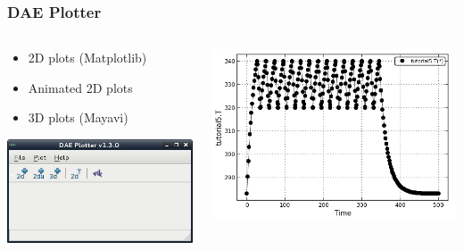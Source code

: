 \documentclass[compress,newPxFont,sthlmFooter]{beamer}
\begin{document}
\begin{frame}
\frametitle{DAE Plotter}
\begin{columns}
  \begin{column}{0.5\paperwidth}
    \begin{center}
      \begin{itemize}
	\item 2D plots (Matplotlib)
	\item Animated 2D plots
	\item 3D plots (Mayavi)
      \end{itemize}
    \end{center}
    \begin{center}
      \includegraphics[width=0.35\paperwidth]{../_static/daeplotter.png}
    \end{center}
  \end{column}
  \begin{column}{0.5\paperwidth}
    \begin{center}
      \includegraphics[width=0.35\paperwidth]{../_static/sample_2d_plot.png}
    \end{center}

\end{column}
\end{columns}
\end{frame}
\end{document}
